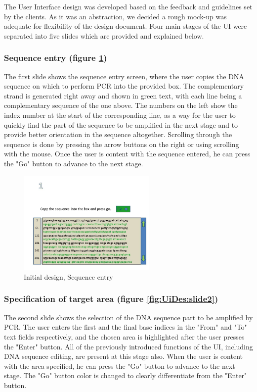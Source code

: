 The User Interface design was developed based on the feedback and
guidelines set by the clients.
As it was an abstraction, we decided a rough mock-up was adequate for
flexibility of the design document.
Four main stages of the UI were separated into five slides which are
provided and explained below.


\subsubsection{Sequence entry (figure \ref{fig:UiDes:slide1})}
The first slide shows the sequence entry screen, where the user copies
the DNA sequence on which to perform PCR into the provided box.
The complementary strand is generated right away and shown in green
text, with each line being a complementary sequence of the one above.
The numbers on the left show the index number at the start of the
corresponding line, as a way for the user to quickly find the part of
the sequence to be amplified in the next stage and to provide better
orientation in the sequence altogether.
Scrolling through the sequence is done by pressing the arrow buttons
on the right or using scrolling with the mouse.
Once the user is content with the sequence entered, he can press the
"Go" button to advance to the next stage.

\begin{figure}[h]
  \begin{center}
	\includegraphics[width=0.6\textwidth]{./images/UiDes/Slide1.JPG}
    \caption{
      \label{fig:UiDes:slide1}
      Initial design, Sequence entry
    }
  \end{center}
\end{figure}

\subsubsection{Specification of target area (figure \ref{fig:UiDes:slide2})}
The second slide shows the selection of the DNA sequence part to be
amplified by PCR.
The user enters the first and the final base indices in the "From" and
"To" text fields respectively, and the chosen area is highlighted
after the user presses the "Enter" button.
All of the previously introduced functions of the UI, including DNA
sequence editing, are present at this stage also.
When the user is content with the area specified, he can press the
"Go" button to advance to the next stage.
The "Go" button color is changed to clearly differentiate from the
"Enter" button.

